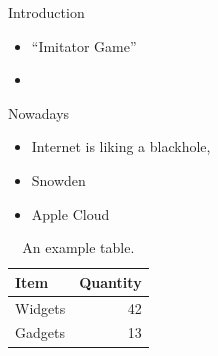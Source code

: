 \documentclass{beamer}
\begin{document}
\begin{frame}{Introduction}

\begin{itemize}
  \item ``Imitator Game''
  \item 
\end{itemize}




\end{frame}





\begin{frame}{Nowadays}

\begin{itemize}
\item Internet is liking a blackhole, 
\item Snowden
\item Apple Cloud
\end{itemize}


\begin{table}
\centering
\begin{tabular}{l|r}
Item & Quantity \\\hline
Widgets & 42 \\
Gadgets & 13
\end{tabular}
\caption{\label{tab:widgets}An example table.}
\end{table}

\end{frame}
\end{document}
